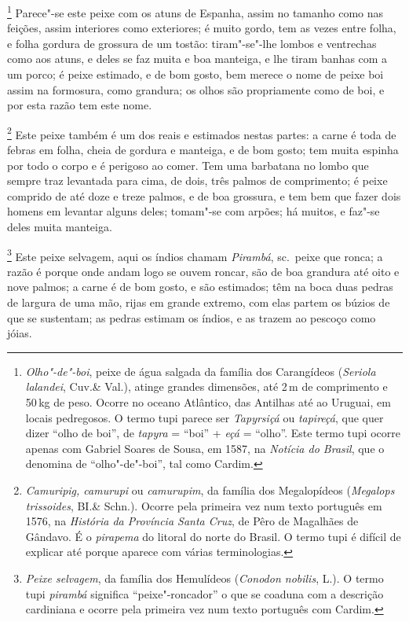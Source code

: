 \footnote{ \textit{Olho"-de"-boi}, peixe de água
salgada da família dos Carangídeos (\textit{Seriola lalandei}, Cuv.\&
Val.), atinge grandes dimensões, até 2\,m de comprimento e 50\,kg de peso.
Ocorre no oceano Atlântico, das Antilhas até ao Uruguai, em locais
pedregosos. O termo tupi parece ser \textit{Tapyrsiçá} ou
\textit{tapireçá}, que quer dizer ``olho de boi'', de \textit{tapyra} = 
``boi'' + \textit{eçá} = ``olho''. Este termo tupi ocorre apenas com
Gabriel Soares de Sousa, em 1587, na \textit{Notícia do Brasil}, que o
denomina de ``olho"-de"-boi'', tal como Cardim.} 
Parece"-se este peixe com os atuns de Espanha, assim no tamanho como
nas feições, assim interiores como exteriores; é muito gordo, tem as
vezes entre folha, e folha gordura de grossura de um tostão:
tiram"-se"-lhe lombos e ventrechas como aos atuns, e deles se faz muita e
boa manteiga, e lhe tiram banhas com a um porco; é peixe estimado, e de
bom gosto, bem merece o nome de peixe boi assim na formosura, como
grandura; os olhos são propriamente como de boi, e por esta razão tem este nome.

\footnote{ \textit{Camuripig, camurupi} ou
\textit{camurupim}, da família dos Megalopídeos (\textit{Megalops
trissoides}, BI.\& Schn.). Ocorre pela primeira vez num texto português
em 1576, na \textit{História da Província Santa Cruz}, de Pêro de
Magalhães de Gândavo. É o \textit{pirapema} do litoral do norte do Brasil.
O termo tupi é difícil de explicar até porque aparece com várias
terminologias.} Este peixe também é um dos reais e
estimados nestas partes: a carne é toda de febras em folha, cheia de
gordura e manteiga, e de bom gosto; tem muita espinha por todo o corpo
e é perigoso ao comer. Tem uma barbatana no lombo que sempre traz
levantada para cima, de dois, três palmos de comprimento; é peixe
comprido de até doze e treze palmos, e de boa grossura, e tem bem que
fazer dois homens em levantar alguns deles; tomam"-se com arpões; há
muitos, e faz"-se deles muita manteiga.

\footnote{ \textit{Peixe selvagem}, da família
dos Hemulídeos (\textit{Conodon nobilis}, L.). O termo tupi
\textit{pirambá} significa ``peixe"-roncador'' o que se coaduna com a
descrição cardiniana e ocorre pela primeira vez num texto português com
Cardim.} Este peixe selvagem, aqui os índios chamam
\textit{Pirambá}, sc.~peixe que ronca; a razão é porque onde andam
logo se ouvem roncar, são de boa grandura até oito e nove palmos; a 
carne é de bom gosto, e são estimados; têm na boca duas pedras de
largura de uma mão, rijas em grande extremo, com elas partem os búzios
de que se sustentam; as pedras estimam os índios, e as trazem ao
pescoço como jóias.

